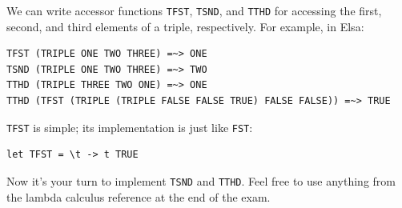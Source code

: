 \documentclass[addpoints]{exam}
\begin{document}
\begin{questions}
We can write accessor functions \verb|TFST|, \verb|TSND|, and \verb|TTHD| for accessing the first, second, and third elements of a triple, respectively.  For example, in Elsa:

\begin{verbatim}
TFST (TRIPLE ONE TWO THREE) =~> ONE
TSND (TRIPLE ONE TWO THREE) =~> TWO
TTHD (TRIPLE THREE TWO ONE) =~> ONE
TTHD (TFST (TRIPLE (TRIPLE FALSE FALSE TRUE) FALSE FALSE)) =~> TRUE
\end{verbatim}

\verb|TFST| is simple; its implementation is just like \verb|FST|:

\begin{verbatim}
let TFST = \t -> t TRUE
\end{verbatim}

Now it's your turn to implement \verb|TSND| and \verb|TTHD|.  Feel free to use anything from the lambda calculus reference at the end of the exam.

\end{questions}
\end{document}
